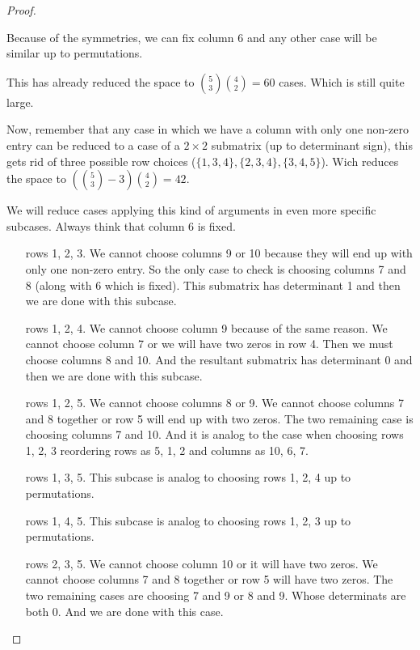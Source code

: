 \begin{proof}
\begin{itemize}
            Because of the symmetries, we can fix column 6 and any other case will be similar up to permutations.\pn
            
            This has already reduced the space to $\binom{5}{3} \binom{4}{2} = 60$ cases. Which is still quite large.\pn
            
            Now, remember that any case in which we have a column with only one non-zero entry can be reduced to a case
            of a $2 \times 2$ submatrix (up to determinant sign), this gets rid of three possible row choices 
            ($\{1, 3, 4\}, \{2, 3, 4\}, \{3, 4, 5\}$). Wich reduces the space to $\left(\binom{5}{3} - 3\right) \binom{4}{2} = 42$.\pn
            
            We will reduce cases applying this kind of arguments in even more specific subcases. Always think that column 6 is fixed.\pn
            
            \begin{itemize}
                \item[rows 1, 2, 3.]
                    We cannot choose columns 9 or 10 because they will end up with only one non-zero entry.
                    So the only case to check is choosing columns 7 and 8 (along with 6 which is fixed). This
                    submatrix has determinant 1 and then we are done with this subcase.
                \item[rows 1, 2, 4.]
                    We cannot choose column 9 because of the same reason. We cannot choose column 7 or we will have
                    two zeros in row 4. Then we must choose columns 8 and 10. And the resultant submatrix has
                    determinant 0 and then we are done with this subcase.
                \item[rows 1, 2, 5.]
                    We cannot choose columns 8 or 9. We cannot choose columns 7 and 8 together or row 5 will end up with two zeros.\pn
                    The two remaining case is choosing columns 7 and 10. And it is analog to the case when choosing rows 1, 2, 3 reordering rows as
                    5, 1, 2 and columns as 10, 6, 7.
                \item[rows 1, 3, 5.]
                    This subcase is analog to choosing rows 1, 2, 4 up to permutations.
                \item[rows 1, 4, 5.]
                    This subcase is analog to choosing rows 1, 2, 3 up to permutations.
                \item[rows 2, 3, 5.]
                    We cannot choose column 10 or it will have two zeros. We cannot choose columns 7 and 8 together or row 5 will have 
                    two zeros.\pn
                    The two remaining cases are choosing 7 and 9 or 8 and 9. Whose determinats are both 0. And we are done with this case.
            \end{itemize}
            

\end{itemize}
\end{proof}
